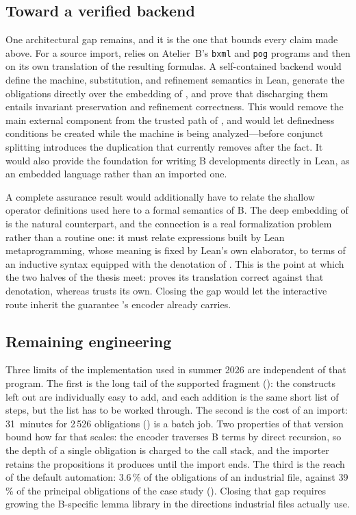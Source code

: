 \subsection{Toward a verified backend}
\label{subsec:barrel-verified-generator}

One architectural gap remains, and it is the one that bounds every claim made above.
For a source import, \barrel{} relies on Atelier~B's \texttt{bxml} and \texttt{pog}
programs and then on its own translation of the resulting formulas.
A self-contained backend would define the machine, substitution, and refinement semantics
in Lean, generate the obligations directly over the embedding of
, and prove that discharging them entails invariant preservation
and refinement correctness.
This would remove the main external component from the trusted path of
, and would let definedness conditions be created while the machine
is being analyzed---before conjunct splitting introduces the duplication that
 currently removes after the fact.
It would also provide the foundation for writing B developments directly in Lean, as an
embedded language rather than an imported one.

A complete assurance result would additionally have to relate the shallow operator
definitions used here to a formal semantics of B.
The deep embedding of  is the natural counterpart, and the connection is a real
formalization problem rather than a routine one: it must relate expressions built by Lean
metaprogramming, whose meaning is fixed by Lean's own elaborator, to terms of an inductive
syntax equipped with the denotation of .
This is the point at which the two halves of the thesis meet: \beer{} proves its translation
correct against that denotation, whereas \barrel{} trusts its own. Closing the gap would let
the interactive route inherit the guarantee \beer{}'s encoder already carries.

\subsection{Remaining engineering}

Three limits of the implementation used in summer 2026 are independent of that program.
The first is the long tail of the supported fragment (): the
constructs left out are individually easy to add, and each addition is the same short list
of steps, but the list has to be worked through.
The second is the cost of an import: 31~minutes for 2\,526 obligations
() is a batch job.
Two properties of that version bound how far that scales: the encoder traverses B
terms by direct recursion, so the depth of a single obligation is charged to the call
stack, and the importer retains the propositions it produces until the import ends.
The third is the reach of the default automation: 3.6\,\% of the obligations of an
industrial file, against 39\,\% of the principal obligations of the case study
().
Closing that gap requires growing the B-specific lemma library in the directions industrial
files actually use.

